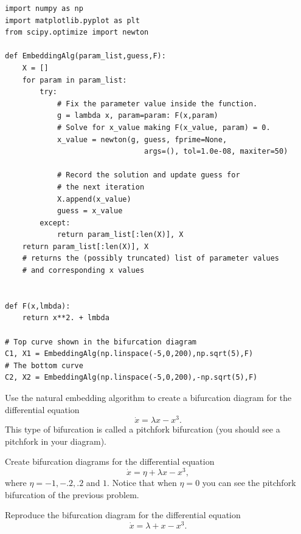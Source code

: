 \begin{lstlisting}
import numpy as np
import matplotlib.pyplot as plt
from scipy.optimize import newton

def EmbeddingAlg(param_list,guess,F):
	X = []
	for param in param_list:
		try:
			# Fix the parameter value inside the function.
			g = lambda x, param=param: F(x,param)
			# Solve for x_value making F(x_value, param) = 0.
			x_value = newton(g, guess, fprime=None, 
								args=(), tol=1.0e-08, maxiter=50)
			
			# Record the solution and update guess for 
			# the next iteration
			X.append(x_value)
			guess = x_value 
		except:
			return param_list[:len(X)], X	
	return param_list[:len(X)], X   		
	# returns the (possibly truncated) list of parameter values 
	# and corresponding x values


def F(x,lmbda):
	return x**2. + lmbda

# Top curve shown in the bifurcation diagram
C1, X1 = EmbeddingAlg(np.linspace(-5,0,200),np.sqrt(5),F)
# The bottom curve
C2, X2 = EmbeddingAlg(np.linspace(-5,0,200),-np.sqrt(5),F)
\end{lstlisting}


\begin{problem}
Use the natural embedding algorithm to create a bifurcation diagram for the differential equation
\[\dot{x} = \lambda x-x^3.\]
This type of bifurcation is called a pitchfork bifurcation (you should see a pitchfork in your diagram).
\end{problem}

\begin{problem}
Create bifurcation diagrams for the differential equation
\[\dot{x} = \eta + \lambda x-x^3,\]
where $\eta = -1, -.2, .2$ and $1.$ Notice that when $\eta = 0$ you can see the pitchfork bifurcation of the previous problem.
\end{problem}

\begin{problem}[Hysteresis]
Reproduce the bifurcation diagram for the differential equation
	\[\dot{x} = \lambda + x - x^3.\]
\end{problem}
